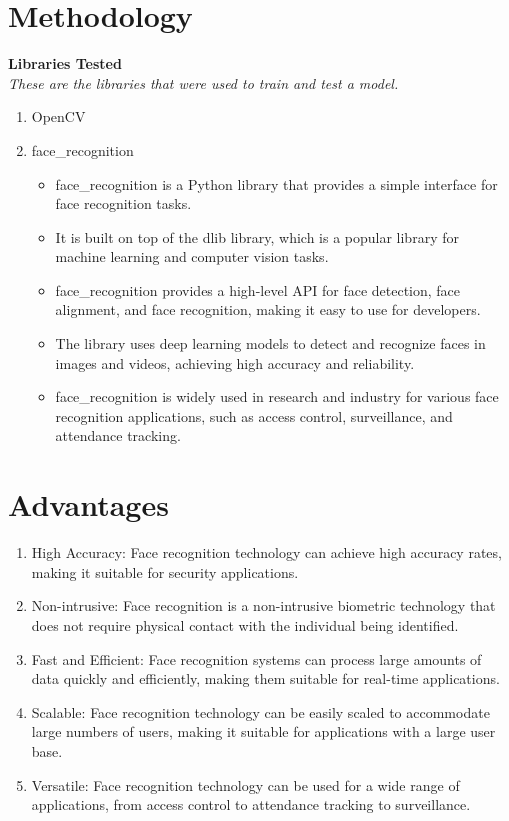 \documentclass[openany]{report}
\begin{document}
\section{Methodology}
\textbf{Libraries Tested} \\
\textit{These are the libraries that were used to train and test a model.}
\begin{enumerate}
    \item OpenCV
    \item face\_recognition
          \begin{itemize}
              \item face\_recognition is a Python library that provides a simple interface for face recognition tasks.
              \item It is built on top of the dlib library, which is a popular library for machine learning and computer vision tasks.
              \item face\_recognition provides a high-level API for face detection, face alignment, and face recognition, making it easy to use for developers.
              \item The library uses deep learning models to detect and recognize faces in images and videos, achieving high accuracy and reliability.
              \item face\_recognition is widely used in research and industry for various face recognition applications, such as access control, surveillance, and attendance tracking.
          \end{itemize}
\end{enumerate}
\section{Advantages}
\begin{enumerate}
    \item High Accuracy: Face recognition technology can achieve high accuracy rates, making it suitable for security applications.
    \item Non-intrusive: Face recognition is a non-intrusive biometric technology that does not require physical contact with the individual being identified.
    \item Fast and Efficient: Face recognition systems can process large amounts of data quickly and efficiently, making them suitable for real-time applications.
    \item Scalable: Face recognition technology can be easily scaled to accommodate large numbers of users, making it suitable for applications with a large user base.
    \item Versatile: Face recognition technology can be used for a wide range of applications, from access control to attendance tracking to surveillance.
\end{enumerate}
\end{document}
